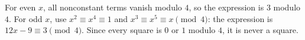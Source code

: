 For even $x$, all nonconstant terms vanish modulo $4$, so the expression is $3$ modulo $4$. For odd $x$, use $x^2\equiv x^4\equiv1$ and $x^3\equiv x^5\equiv x\pmod4$: the expression is $12x-9\equiv3\pmod4$. Since every square is $0$ or $1$ modulo $4$, it is never a square.
